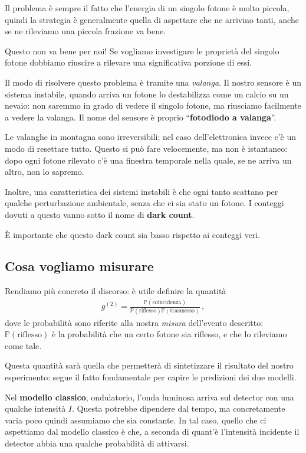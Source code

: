 \documentclass{article}
\begin{document}
Il problema è sempre il fatto che l'energia di un singolo fotone è molto piccola, quindi la strategia è generalmente quella di aspettare che ne arrivino tanti, anche se ne rileviamo una piccola frazione va bene.

Questo non va bene per noi! Se vogliamo investigare le proprietà del singolo fotone dobbiamo riuscire a rilevare una significativa porzione di essi.

Il modo di risolvere questo problema è tramite una \emph{valanga}.
Il nostro sensore è un sistema instabile, quando arriva un fotone lo destabilizza come un calcio su un nevaio: non saremmo in grado di vedere il singolo fotone, ma riusciamo facilmente a vedere la valanga.
Il nome del sensore è proprio ``\textbf{fotodiodo a valanga}''.

Le valanghe in montagna sono irreversibili; nel caso dell'elettronica invece c'è un modo di resettare tutto.
Questo si può fare velocemente, ma non è istantaneo: dopo ogni fotone rilevato c'è una finestra temporale nella quale, se ne arriva un altro, non lo sapremo. 

Inoltre, una caratteristica dei sistemi instabili è che ogni tanto scattano per qualche perturbazione ambientale, senza che ci sia stato un fotone. 
I conteggi dovuti a questo vanno sotto il nome di \textbf{dark count}.

È importante che questo dark count sia basso rispetto ai conteggi veri.

\subsection{Cosa vogliamo misurare}

Rendiamo più concreto il discorso: è utile definire la quantità 
%
\begin{align}
g^{(2)} = \frac{\mathbb{P}(\text{coincidenza})}{\mathbb{P}(\text{riflesso})\mathbb{P}(\text{trasmesso})}
\,,
\end{align}
%
dove le probabilità sono riferite alla nostra \emph{misura} dell'evento descritto: \(\mathbb{P} (\text{riflesso})\) è la probabilità che un certo fotone sia riflesso, e che lo rileviamo come tale.


Questa quantità sarà quella che permetterà di sintetizzare il risultato del nostro esperimento: segue il fatto fondamentale per capire le predizioni dei due modelli. 

Nel \textbf{modello classico}, ondulatorio, l'onda luminosa arriva sul detector con una qualche intensità \(I\). Questa potrebbe dipendere dal tempo, ma concretamente varia poco quindi assumiamo che sia constante.
In tal caso, quello che ci aspettiamo dal modello classico è che, a seconda di quant'è l'intensità incidente il detector abbia una qualche probabilità di attivarsi. 
\end{document}
